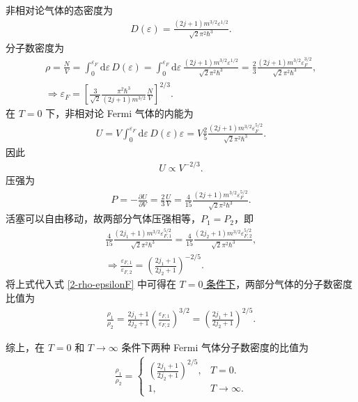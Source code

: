 \documentclass{assignment}
\begin{document}
\begin{sol}
    非相对论气体的态密度为
    \begin{align}
        D(\varepsilon)=\frac{(2j+1)m^{3/2}\varepsilon^{1/2}}{\sqrt{2}\pi^2\hbar^3}.
    \end{align}
    分子数密度为
    \begin{gather}
        \label{2-rho-epsilonF}
        \rho=\frac{N}{V}=\int_0^{\varepsilon_F}\mathrm{d}\varepsilon\,D(\varepsilon)=\int_0^{\varepsilon_F}\mathrm{d}\varepsilon\,\frac{(2j+1)m^{3/2}\varepsilon^{1/2}}{\sqrt{2}\pi^2\hbar^3}=\frac{2}{3}\frac{(2j+1)m^{3/2}\varepsilon_F^{3/2}}{\sqrt{2}\pi^2\hbar^3},\\
        \Longrightarrow\varepsilon_F=\left[\frac{3}{\sqrt{2}}\frac{\pi^2\hbar^3}{(2j+1)m^{3/2}}\frac{N}{V}\right]^{2/3}.
    \end{gather}
    在 $T=0$ 下，非相对论 Fermi 气体的内能为
    \begin{align}
        U=V\int_0^{\varepsilon_F}\mathrm{d}\varepsilon\,D(\varepsilon)\varepsilon=V\frac{2}{5}\frac{(2j+1)m^{3/2}\varepsilon_F^{5/2}}{\sqrt{2}\pi^2\hbar^3}.
    \end{align}
    因此
    \begin{align}
        U\propto V^{-2/3}.
    \end{align}
    压强为
    \begin{align}
        P=-\frac{\partial U}{\partial V}=\frac{2}{3}\frac{U}{V}=\frac{4}{15}\frac{(2j+1)m^{3/2}\varepsilon_F^{5/2}}{\sqrt{2}\pi^2\hbar^3}.
    \end{align}
    活塞可以自由移动，故两部分气体压强相等，$P_1=P_2$，即
    \begin{gather}
        \frac{4}{15}\frac{(2j_1+1)m^{3/2}\varepsilon_{F,1}^{5/2}}{\sqrt{2}\pi^2\hbar^3}=\frac{4}{15}\frac{(2j_2+1)m^{3/2}\varepsilon_{F,2}^{5/2}}{\sqrt{2}\pi^2\hbar^3},\\
        \Longrightarrow\frac{\varepsilon_{F,1}}{\varepsilon_{F,2}}=\left(\frac{2j_1+1}{2j_2+1}\right)^{-2/5}.
    \end{gather}
    将上式代入式 \eqref{2-rho-epsilonF} 中可得在 \uline{$T=0$ 条件下}，两部分气体的分子数密度比值为
    \begin{align}
        \boxed{\frac{\rho_1}{\rho_2}=\frac{2j_1+1}{2j_2+1}\left(\frac{\varepsilon_{F,1}}{\varepsilon_{F,2}}\right)^{3/2}=\left(\frac{2j_1+1}{2j_2+1}\right)^{2/5}.}
    \end{align}

    综上，在 $T=0$ 和 $T\rightarrow\infty$ 条件下两种 Fermi 气体分子数密度的比值为
    \begin{align}
        \boxed{\frac{\rho_1}{\rho_2}=\left\{\begin{array}{ll}
            \left(\frac{2j_1+1}{2j_2+1}\right)^{2/5},&T=0.\\
            1,&T\rightarrow\infty.
        \end{array}\right.}
    \end{align}
\end{sol}
\clearpage
\end{document}

